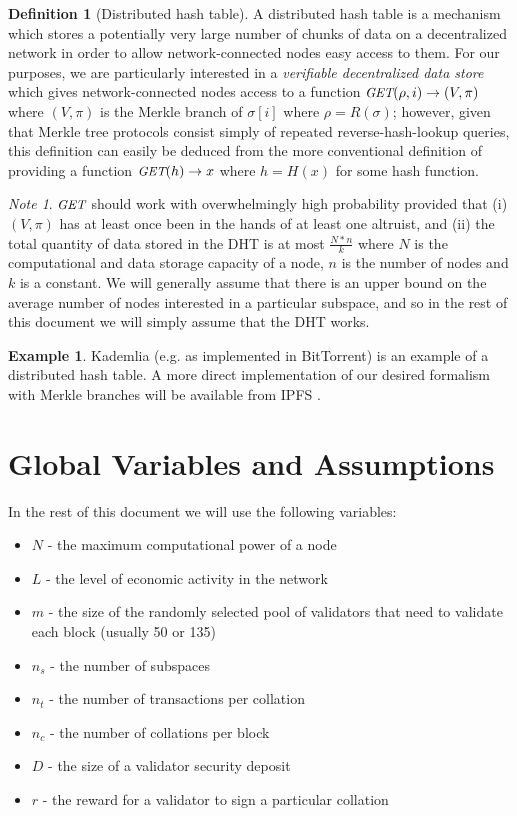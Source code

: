\documentclass[11pt,a4paper]{article}
\makeatletter
\theoremstyle{plain}
\theoremstyle{definition}
\newtheorem{defn}{Definition}[section]
\newtheorem{exmp}{Example}[section]
\theoremstyle{remark}
\newtheorem*{note}{Note}
\newcommand{\eg}{e.g.\@\xspace}
\newcommand{\makeintoafunction}[1]{\textit{\uppercase{\small #1}}}
\newcommand{\GET}{\makeintoafunction{get}}
\makeatother
\begin{document}
\begin{defn}[Distributed hash table]
A distributed hash table is a mechanism which stores a potentially very large number of chunks of data on a decentralized network in order to allow network-connected nodes easy access to them. For our purposes, we are particularly interested in a \emph{verifiable decentralized data store} which gives network-connected nodes access to a function $\GET(\rho, i) \rightarrow (V, \pi)$ where $(V, \pi)$ is the Merkle branch of $\sigma[i]$ where $\rho = R(\sigma)$; however, given that Merkle tree protocols consist simply of repeated reverse-hash-lookup queries, this definition can easily be deduced from the more conventional definition of providing a function $\GET(h) \rightarrow x$ where $h = H(x)$ for some hash function.
\end{defn}

\begin{note}
$\GET$ should work with overwhelmingly high probability provided that (i) $(V, \pi)$ has at least once been in the hands of at least one altruist, and (ii) the total quantity of data stored in the DHT is at most $\frac{N * n}{k}$ where $N$ is the computational and data storage capacity of a node, $n$ is the number of nodes and $k$ is a constant. We will generally assume that there is an upper bound on the average number of nodes interested in a particular subspace, and so in the rest of this document we will simply assume that the DHT works.
\end{note}

\begin{exmp}
Kademlia \cite{kademlia} (\eg as implemented in BitTorrent) is an example of a distributed hash table. A more direct implementation of our desired formalism with Merkle branches will be available from IPFS \cite{ipfs}.
\end{exmp}

\section{Global Variables and Assumptions}

In the rest of this document we will use the following variables:

\begin{itemize}
\item
$N$ - the maximum computational power of a node
\item
$L$ - the level of economic activity in the network
\item
$m$ - the size of the randomly selected pool of validators that need to validate each block (usually 50 or 135)
\item
$n_s$ - the number of subspaces
\item
$n_t$ - the number of transactions per collation
\item
$n_c$ - the number of collations per block
\item
$D$ - the size of a validator security deposit
\item
$r$ - the reward for a validator to sign a particular collation
\end{itemize}
\end{document}
